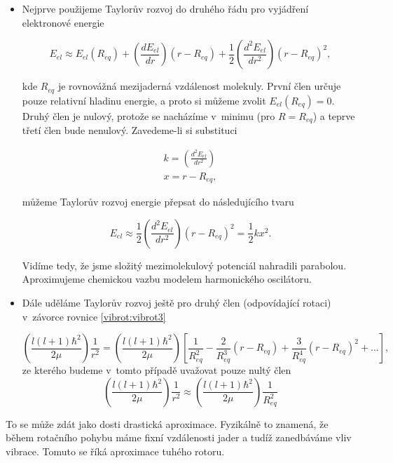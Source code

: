 \begin{itemize}

\item Nejprve použijeme Taylorův rozvoj do druhého řádu pro vyjádření elektronové energie

\begin{equation}
E_{el}\approx E_{el}(R_{eq})+\left(\frac{dE_{el}}{dr}\right)(r-R_{eq})+\frac{1}{2}\left(\frac{d^2E_{el}}{dr^2}\right)(r-R_{eq})^2, 
\end{equation}

\noindent kde $R_{eq}$ je rovnovážná mezijaderná vzdálenost molekuly. První člen určuje pouze relativní hladinu energie, a proto si můžeme zvolit $E_{el}(R_{eq})=0$. Druhý člen je nulový, protože se nacházíme v~minimu (pro $R = R_{eq}$) a teprve třetí člen bude nenulový. Zavedeme-li si substituci

\begin{eqnarray}
k=\left(\frac{d^2E_{el}}{dr^2}\right)\nonumber \\
x=r-R_{eq}\nonumber,
\end{eqnarray}

\noindent můžeme Taylorův rozvoj energie přepsat do následujícího tvaru

\begin{equation}
E_{el}\approx\frac{1}{2}\left(\frac{d^2E_{el}}{dr^2}\right)(r-R_{eq})^2=\frac{1}{2}kx^2.
\end{equation}

\noindent Vidíme tedy, že jsme složitý mezimolekulový potenciál nahradili parabolou. Aproximujeme chemickou vazbu modelem harmonického oscilátoru.

\item Dále uděláme Taylorův rozvoj ještě pro druhý člen (odpovídající rotaci) v~závorce rovnice \ref{vibrot:vibrot3}

\begin{equation}
\left(\frac{l\left(l+1\right)\hbar^2}{2\mu}\right)\frac{1}{r^2} =
\left(\frac{l\left(l+1\right)\hbar^2}{2\mu}\right)
\left[\frac{1}{R_{eq}^2}
-\frac{2}{R_{eq}^3}(r-R_{eq})
+\frac{3}{R_{eq}^4}(r-R_{eq})^2+...
\right],
\end{equation}
ze kterého budeme v~tomto případě uvažovat pouze nultý člen
\begin{equation}
\left(\frac{l\left(l+1\right)\hbar^2}{2\mu}\right)\frac{1}{r^2} \approx \left(\frac{l\left(l+1\right)\hbar^2}{2\mu}\right)\frac{1}{R_{eq}^2}
\end{equation}
\end{itemize}
\noindent To se může zdát jako dosti drastická aproximace. Fyzikálně to znamená, že během rotačního pohybu máme fixní vzdálenosti jader a tudíž zanedbáváme vliv vibrace. Tomuto se říká aproximace tuhého rotoru.



